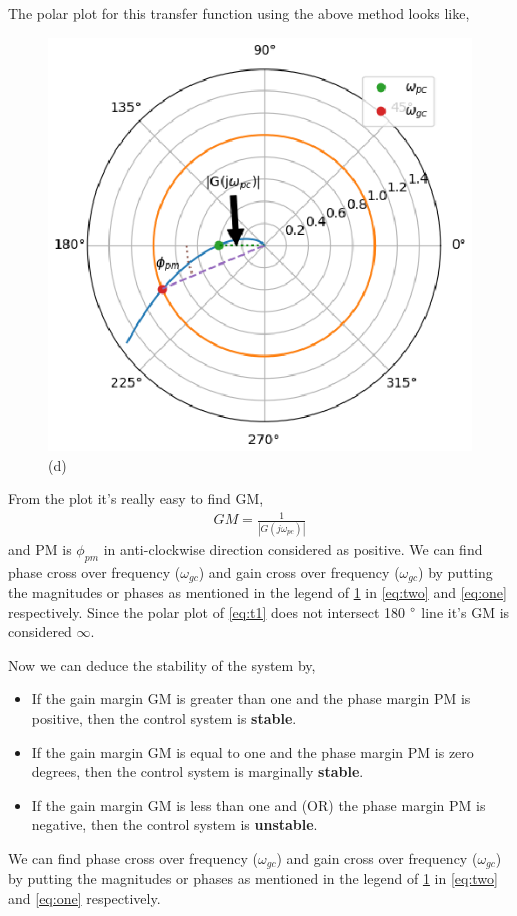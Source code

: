 \begin{enumerate}[label=\thesection.\arabic*.,ref=\thesection.\theenumi]
The polar plot for this transfer function using the above method looks like,
\begin{figure}[!h]
    \includegraphics[width=\columnwidth]{./figs/ee18btech11028/example.eps}
  \caption{(d)}
  \label{fig:example1}
\end{figure}

From the plot it's really easy to find GM,
\begin{align}
    GM = \frac{1}{|G(j\omega_{pc})|}
\end{align}
and PM is $\phi_{pm}$ in anti-clockwise direction considered as positive.
We can find phase cross over frequency ($\omega_{gc}$) and gain cross over frequency ($\omega_{gc}$) by putting the magnitudes or phases as mentioned in the legend of \ref{fig:example1} in \eqref{eq:two}
and \eqref{eq:one} respectively.
Since the polar plot of \eqref{eq:t1} does not intersect 180 $\degree$ line it's GM is considered $\infty$.

Now we can deduce the stability of the system by,
\begin{itemize}
    \item If the gain margin GM is greater than one and the phase margin PM is positive, then the control system is \textbf{stable}.
    \item If the gain margin GM is equal to one and the phase margin PM is zero degrees, then the control system is marginally \textbf{stable}.
    \item If the gain margin GM is less than one and (OR) the phase margin PM is negative, then the control system is \textbf{unstable}.
\end{itemize}


We can find phase cross over frequency ($\omega_{gc}$) and gain cross over frequency ($\omega_{gc}$) by putting the magnitudes or phases as mentioned in the legend of \ref{fig:example1} in \eqref{eq:two}
and \eqref{eq:one} respectively.


\end{enumerate}
